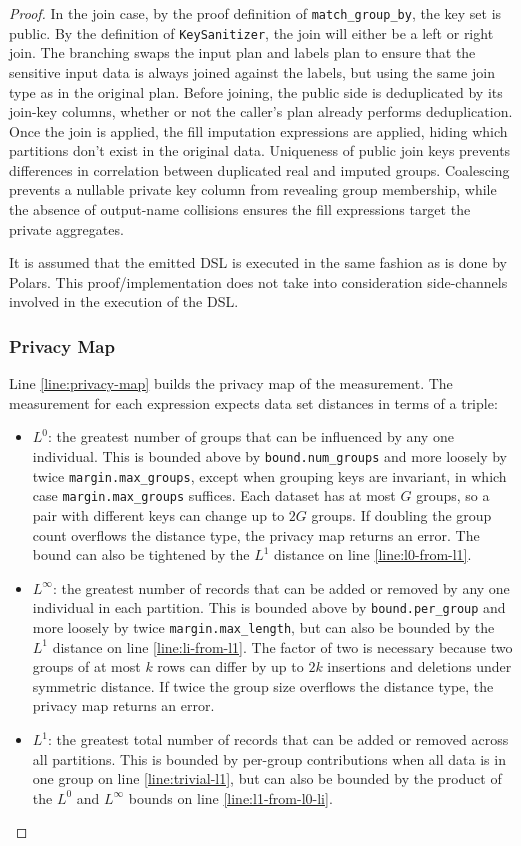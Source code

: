 \documentclass{article}
\begin{document}
\begin{proof}
In the join case, by the proof definition of \texttt{match\_group\_by}, the key set is public.
By the definition of \texttt{KeySanitizer}, the join will either be a left or right join.
The branching swaps the input plan and labels plan to ensure that the sensitive input data is always joined against the labels,
but using the same join type as in the original plan.
Before joining, the public side is deduplicated by its join-key columns, whether or not the
caller's plan already performs deduplication.
Once the join is applied, the fill imputation expressions are applied, hiding which partitions don't exist in the original data.
Uniqueness of public join keys prevents differences in correlation between duplicated real and imputed groups.
Coalescing prevents a nullable private key column from revealing group membership, while
the absence of output-name collisions ensures the fill expressions target the private aggregates.

It is assumed that the emitted DSL is executed in the same fashion as is done by Polars.
This proof/implementation does not take into consideration side-channels involved in the execution of the DSL.

\subsubsection{Privacy Map}
Line \ref{line:privacy-map} builds the privacy map of the measurement.
The measurement for each expression expects data set distances in terms of a triple:
\begin{itemize}
    \item $L^0$: the greatest number of groups that can be influenced by any one individual.
    This is bounded above by \texttt{bound.num\_groups} and more loosely by twice \texttt{margin.max\_groups},
    except when grouping keys are invariant, in which case \texttt{margin.max\_groups} suffices.
    Each dataset has at most $G$ groups, so a pair with different keys can change up to $2G$ groups.
    If doubling the group count overflows the distance type, the privacy map returns an error.
    The bound can also be tightened by the $L^1$ distance on line \ref{line:l0-from-l1}.
    \item $L^\infty$: the greatest number of records that can be added or removed by any one individual in each partition.
    This is bounded above by \texttt{bound.per\_group} and more loosely by twice \texttt{margin.max\_length},
    but can also be bounded by the $L^1$ distance on line \ref{line:li-from-l1}.
    The factor of two is necessary because two groups of at most $k$ rows can differ
    by up to $2k$ insertions and deletions under symmetric distance.
    If twice the group size overflows the distance type, the privacy map returns an error.
    \item $L^1$: the greatest total number of records that can be added or removed across all partitions.
    This is bounded by per-group contributions when all data is in one group on line \ref{line:trivial-l1},
    but can also be bounded by the product of the $L^0$ and $L^\infty$ bounds on line \ref{line:l1-from-l0-li}.
\end{itemize}


\end{proof}
\end{document}
